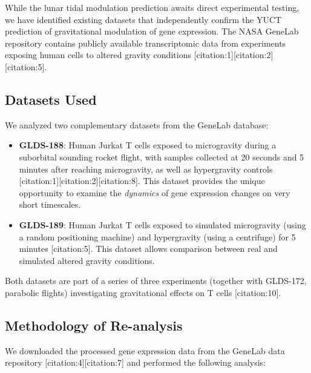 \documentclass[12pt,a4paper]{article}
\theoremstyle{remark}
\begin{document}
	While the lunar tidal modulation prediction awaits direct experimental testing, we have identified existing datasets that independently confirm the YUCT prediction of gravitational modulation of gene expression. The NASA GeneLab repository contains publicly available transcriptomic data from experiments exposing human cells to altered gravity conditions [citation:1][citation:2][citation:5].
	
	\subsection{Datasets Used}
	
	We analyzed two complementary datasets from the GeneLab database:
	
	\begin{itemize}
		\item \textbf{GLDS-188}: Human Jurkat T cells exposed to microgravity during a suborbital sounding rocket flight, with samples collected at 20 seconds and 5 minutes after reaching microgravity, as well as hypergravity controls [citation:1][citation:2][citation:8]. This dataset provides the unique opportunity to examine the \textit{dynamics} of gene expression changes on very short timescales.
		
		\item \textbf{GLDS-189}: Human Jurkat T cells exposed to simulated microgravity (using a random positioning machine) and hypergravity (using a centrifuge) for 5 minutes [citation:5]. This dataset allows comparison between real and simulated altered gravity conditions.
	\end{itemize}
	
	Both datasets are part of a series of three experiments (together with GLDS-172, parabolic flights) investigating gravitational effects on T cells [citation:10].
	
	\subsection{Methodology of Re-analysis}
	
	We downloaded the processed gene expression data from the GeneLab data repository [citation:4][citation:7] and performed the following analysis:
	
\end{document}
